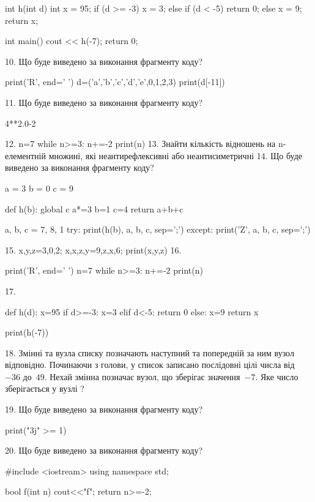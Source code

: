 \documentclass[11pt]{article}
\begin{document}
int h(int d){
    int x = 95;
    if (d >= -3) 
        x = 3;
    else if (d < -5)
         return 0;
    else
         x = 9;
    return x;
}

int main(){
    cout << h(-7);
    return 0;
}


10. Що буде виведено за виконання фрагменту коду?

print('R', end=' ')
d=('a','b','c','d','e',0,1,2,3)
print(d[-11])


11. Що буде виведено за виконання фрагменту коду?

4**2.0-2

12. 
n=7
   while n>=3: n+=-2
   print(n)
13. 
Знайти кількість відношень на n-елементній множині, які неантирефлексивні або неантисиметричні
14. Що буде виведено за виконання фрагменту коду?

a = 3
b = 0
c = 9

def h(b):
global c    a*=3
    b=1
    c=4
    return a+b+c

a, b, c = 7, 8, 1
try:
    print(h(b), a, b, c, sep=';')
except:
    print('Z', a, b, c, sep=';')

15. 
x,y,z=3,0,2;  x,x,z,y=9,z,x,6;  print(x,y,z)
16. 

print('R', end=' ')
n=7
while n>=3:
    n+=-2
print(n)


17. 

def h(d):
    x=95
    if d>=-3: 
        x=3
    elif d<-5:
         return 0
    else:
         x=9
    return x

print(h(-7))

18. 
Змінні  та  вузла списку позначають наступний та попередній за ним вузол відповідно. Починаючи з голови, у список записано послідовні цілі числа від~$-36$ до~$49$. Нехай змінна  позначає вузол, що зберігає значення~$-7$.
Яке число зберігається у вузлі  ?

19. Що буде виведено за виконання фрагменту коду?

print("3j" >= 1)

20. Що буде виведено за виконання фрагменту коду?

#include <iostream>
using namespace std;

bool f(int n){
    cout<<"f";
    return n>=-2;
}
\end{document}
